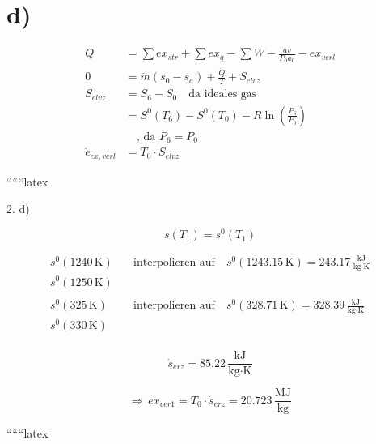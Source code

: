 \section*{d)}
\begin{align*}
Q &= \sum ex_{str} + \sum ex_q - \sum W - \frac{av}{P_0 a_0} - ex_{verl} \\
0 &= \dot{m}(s_0 - s_a) + \frac{\dot{Q}}{T} + S_{elvz} \\
S_{elvz} &= S_6 - S_0 \quad \text{da ideales gas} \\
&= S^0(T_6) - S^0(T_0) - R \ln \left( \frac{P_6}{P_0} \right) \\
&\quad \text{, da } P_6 = P_0 \\
\dot{e}_{ex,verl} &= T_0 \cdot S_{elvz}
\end{align*}

``````latex

2. d)

\[
s(T_1) = s^0(T_1)
\]

\[
\begin{aligned}
s^0(1240 \, \text{K}) & \quad \text{interpolieren auf} \quad s^0(1243.15 \, \text{K}) = 243.17 \, \frac{\text{kJ}}{\text{kg} \cdot \text{K}} \\
s^0(1250 \, \text{K}) & \\
\\
s^0(325 \, \text{K}) & \quad \text{interpolieren auf} \quad s^0(328.71 \, \text{K}) = 328.39 \, \frac{\text{kJ}}{\text{kg} \cdot \text{K}} \\
s^0(330 \, \text{K}) & \\
\end{aligned}
\]

\[
\dot{s}_{erz} = 85.22 \, \frac{\text{kJ}}{\text{kg} \cdot \text{K}}
\]

\[
\Rightarrow \, ex_{ver1} = T_0 \cdot \dot{s}_{erz} = 20.723 \, \frac{\text{MJ}}{\text{kg}}
\]

``````latex


